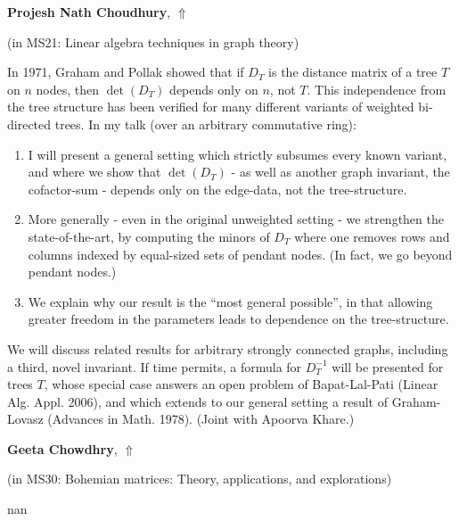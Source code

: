 \documentclass[ILAS2025-program.tex]{subfiles}
\begin{document}
\hypertarget{down0171}{}\begin{ilasabstract}
    
\textbf{Projesh Nath Choudhury},  \hfill \hyperlink{up0171}{$\Uparrow$}
    
    
(in {\color{mstitle}MS21: Linear algebra techniques in graph theory})
        
\mtskip
    In 1971, Graham and Pollak showed that if $D_T$ is the distance matrix of a tree $T$ on $n$ nodes, then $\det(D_T)$ depends only on $n$, not $T$. This independence from the tree structure has been verified for many different variants of weighted bi-directed trees. In my talk (over an arbitrary commutative ring):
\begin{enumerate}
 \item I will present a general setting which strictly subsumes every known variant, and where we show that $\det(D_T)$ - as well as another graph invariant, the cofactor-sum - depends only on the edge-data, not the tree-structure.
 \item More generally - even in the original unweighted setting - we strengthen the state-of-the-art, by computing the minors of $D_T$ where one removes rows and columns indexed by equal-sized sets of pendant nodes. (In fact, we go beyond pendant nodes.)
 \item We explain why our result is the ``most general possible'', in that allowing greater freedom in the parameters leads to dependence on the tree-structure.
\end{enumerate}
We will discuss related results for arbitrary strongly connected graphs, including a third, novel invariant. If time permits, a formula for  $D_T^{-1}$ will be presented for trees $T$, whose special case answers an open problem of Bapat-Lal-Pati (Linear Alg. Appl. 2006), and which extends to our general setting a result of Graham-Lovasz (Advances in Math. 1978). (Joint with Apoorva Khare.)
\end{ilasabstract}
    

\hypertarget{down0232}{}\begin{ilasabstract}
    
\textbf{Geeta Chowdhry},  \hfill \hyperlink{up0232}{$\Uparrow$}
    
    
(in {\color{mstitle}MS30: Bohemian matrices: Theory, applications, and explorations})
        
\mtskip
    nan
\end{ilasabstract}
    
\end{document}
